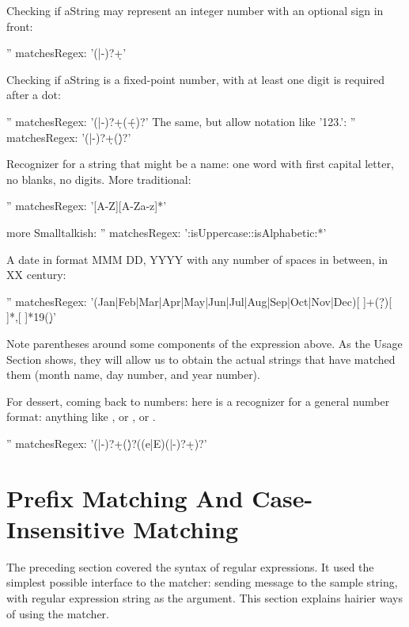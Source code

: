 \documentclass[a4paper,10pt,twoside]{book}
\begin{document}
{ 
 
 Checking if aString may represent an integer number with an optional sign in front: 
 \begin{code}{}
'' matchesRegex: '(\+|-)?\d+' 
 \end{code}
 
Checking if aString is a fixed-point number, with at least one digit is required after a dot: 

\begin{code}{}
'' matchesRegex: '(\+|-)?\d+(\.\d+)?' 
The same, but allow notation like '123.': 
'' matchesRegex: '(\+|-)?\d+(\.\d*)?' 
\end{code} 
 
Recognizer for a string that might be a name: one word with first capital letter, no blanks, no digits.  More traditional: 	
\begin{code}{}
'' matchesRegex: '[A-Z][A-Za-z]*' 

more Smalltalkish: 	
'' matchesRegex: ':isUppercase::isAlphabetic:*'
\end{code}
 
 
  A date in format MMM DD, YYYY with any number of spaces in between, in XX century: 
  
  \begin{code}{}
'' matchesRegex: '(Jan|Feb|Mar|Apr|May|Jun|Jul|Aug|Sep|Oct|Nov|Dec)[ ]+(\d\d?)[ ]*,[ ]*19(\d\d)' 
\end{code}

Note parentheses around some components of the expression above. As the Usage Section shows, they will allow us to obtain the actual strings that have matched them (\ie month name, day number, and year number). 


For dessert, coming back to numbers: here is a recognizer for a general number format: anything like , or , or . 	

\begin{code}{}
'' matchesRegex: '(\+|-)?\d+(\.\d*)?((e|E)(\+|-)?\d+)?'
\end{code}



\section{Prefix Matching And Case-Insensitive Matching}
The preceding section covered the syntax of regular expressions. It used the 
simplest possible interface to the matcher: sending  message to the sample string, with regular expression string as the argument. This section explains hairier ways of using the matcher. 	

}
\end{document}
